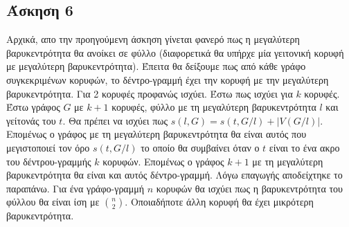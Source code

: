 \newpage\subsection*{Άσκηση 6}
Αρχικά, απο την προηγούμενη άσκηση γίνεται φανερό πως η μεγαλύτερη βαρυκεντρότητα θα ανοίκει σε φύλλο 
(διαφορετικά θα υπήρχε μία γειτονική κορυφή με μεγαλύτερη βαρυκεντρότητα).
Έπειτα θα δείξουμε πως από κάθε γράφο συγκεκριμένων κορυφών, το δέντρο-γραμμή έχει την κορυφή με την μεγαλύτερη βαρυκεντρότητα.
Για 2 κορυφές προφανώς ισχύει.
Έστω πως ισχύει για $k$ κορυφές. Έστω γράφος $G$ με $k+1$ κορυφές, φύλλο με τη μεγαλύτερη βαρυκεντρότητα $l$ και γείτονάς του $t$.
Θα πρέπει να ισχύει πως $s(l,G) = s(t,G/l) + |V(G/l)|$. 
Επομένως ο γράφος με τη μεγαλύτερη βαρυκεντρότητα θα είναι αυτός που μεγιστοποιεί τον όρο                                                               
$s(t,G/l)$ το οποίο θα συμβαίνει όταν ο $t$ είναι το ένα ακρο του δέντρου-γραμμής $k$ κορυφών. Επομένως ο γράφος $k+1$ με τη μεγαλύτερη βαρυκεντρότητα θα                                                       
είναι και αυτός δέντρο-γραμμή. Λόγω επαγωγής αποδείχτηκε το παραπάνω.                                                                                                                                           Για ένα γράφο-γραμμή $n$ κορυφών θα ισχύει πως η βαρυκεντρότητα του φύλλου θα είναι ίση με $\binom{n}{2}$.
Οποιαδήποτε άλλη κορυφή θα έχει μικρότερη βαρυκεντρότητα.
     

